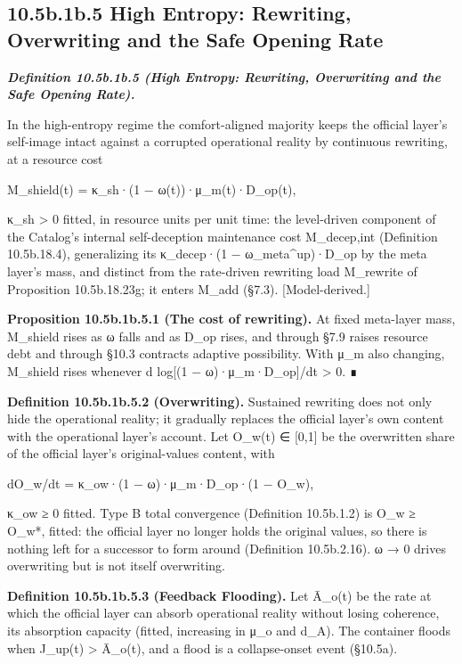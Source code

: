 \documentclass[
]{article}
\begin{document}
\hypertarget{b.1b.5-high-entropy-rewriting-overwriting-and-the-safe-opening-rate}{%
\subsection{10.5b.1b.5 High Entropy: Rewriting, Overwriting and the Safe
Opening
Rate}\label{b.1b.5-high-entropy-rewriting-overwriting-and-the-safe-opening-rate}}

\emph{\textbf{Definition 10.5b.1b.5 (High Entropy: Rewriting,
Overwriting and the Safe Opening Rate).}}

In the high-entropy regime the comfort-aligned majority keeps the
official layer's self-image intact against a corrupted operational
reality by continuous rewriting, at a resource cost

M\_shield(t) = κ\_sh·(1 − ω(t))·μ\_m(t)·D\_op(t),

κ\_sh \textgreater{} 0 fitted, in resource units per unit time: the
level-driven component of the Catalog's internal self-deception
maintenance cost M\_decep,int (Definition 10.5b.18.4), generalizing its
κ\_decep·(1 − ω\_meta\^{}up)·D\_op by the meta layer's mass, and
distinct from the rate-driven rewriting load M\_rewrite of Proposition
10.5b.18.23g; it enters M\_add (§7.3). {[}Model-derived.{]}

\textbf{Proposition 10.5b.1b.5.1 (The cost of rewriting).} At fixed
meta-layer mass, M\_shield rises as ω falls and as D\_op rises, and
through §7.9 raises resource debt and through §10.3 contracts adaptive
possibility. With μ\_m also changing, M\_shield rises whenever d
log{[}(1 − ω)·μ\_m·D\_op{]}/dt \textgreater{} 0. ∎

\textbf{Definition 10.5b.1b.5.2 (Overwriting).} Sustained rewriting does
not only hide the operational reality; it gradually replaces the
official layer's own content with the operational layer's account. Let
O\_w(t) ∈ {[}0,1{]} be the overwritten share of the official layer's
original-values content, with

dO\_w/dt = κ\_ow·(1 − ω)·μ\_m·D\_op·(1 − O\_w),

κ\_ow ≥ 0 fitted. Type B total convergence (Definition 10.5b.1.2) is
O\_w ≥ O\_w*, fitted: the official layer no longer holds the original
values, so there is nothing left for a successor to form around
(Definition 10.5b.2.16). ω → 0 drives overwriting but is not itself
overwriting.

\textbf{Definition 10.5b.1b.5.3 (Feedback Flooding).} Let Ā\_o(t) be the
rate at which the official layer can absorb operational reality without
losing coherence, its absorption capacity (fitted, increasing in μ\_o
and d\_A). The container floods when J\_up(t) \textgreater{} Ā\_o(t),
and a flood is a collapse-onset event (§10.5a).
\end{document}
